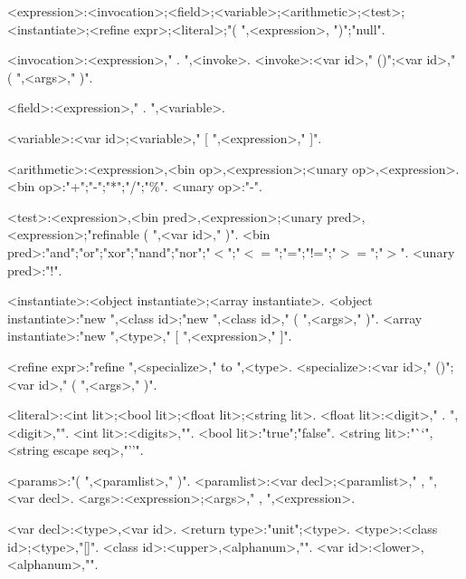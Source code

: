 \begin{grammar}
<expression>:<invocation>;<field>;<variable>;<arithmetic>;<test>;<instantiate>;<refine expr>;<literal>;"( ",<expression>, ")";"null".

<invocation>:<expression>," . ",<invoke>.
<invoke>:<var id>," ()";<var id>," ( ",<args>," )".

<field>:<expression>," . ",<variable>.

<variable>:<var id>;<variable>," [ ",<expression>," ]".

<arithmetic>:<expression>,<bin op>,<expression>;<unary op>,<expression>.
<bin op>:"+";"-";"*";"/";"\%".
<unary op>:"-".

<test>:<expression>,<bin pred>,<expression>;<unary pred>,<expression>;"refinable ( ",<var id>," )".
<bin pred>:"and";"or";"xor";"nand";"nor";"$<$";"$<=$";"=";"!=";"$>=$";"$>$".
<unary pred>:"!".

<instantiate>:<object instantiate>;<array instantiate>.
<object instantiate>:"new ",<class id>;"new ",<class id>," ( ",<args>," )".
<array instantiate>:"new ",<type>," [ ",<expression>," ]".

<refine expr>:"refine ",<specialize>," to ",<type>.
<specialize>:<var id>," ()";<var id>," ( ",<args>," )".

<literal>:<int lit>;<bool lit>;<float lit>;<string lit>.
<float lit>:<digit>,"{\small *} . ",<digit>,"{\small *}".
<int lit>:<digits>,"{\small *}".
<bool lit>:"true";"false".
<string lit>:"``",<string escape seq>,"''".

<params>:"( ",<paramlist>," )".
<paramlist>:<var decl>;<paramlist>," , ",<var decl>.
<args>:<expression>;<args>," , ",<expression>.

<var decl>:<type>,<var id>.
<return type>:"unit";<type>.
<type>:<class id>;<type>,"[]".
<class id>:<upper>,<alphanum>,"{\small *}".
<var id>:<lower>,<alphanum>,"{\small *}".

\end{grammar}
